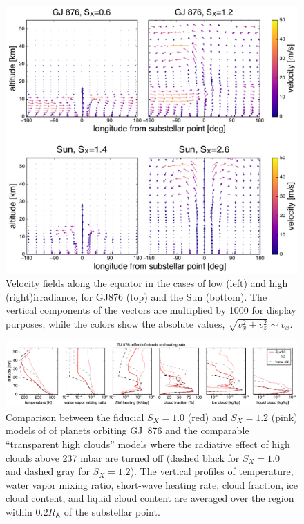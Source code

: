\documentclass[11pt,numberedappendix,twocolappendix,]{emulateapj}
\def\wv{water vapor}
\begin{document}
\begin{figure}[htb]
    \begin{center}
    \includegraphics[width=1\hsize]{vectormap_z_1000.pdf}
    \end{center}
\caption{Velocity fields along the equator in the cases of low (left) and high (right)irradiance, for GJ876 (top) and the Sun (bottom). The vertical components of the vectors are multiplied by 1000 for display purposes, while the colors show the absolute values, $\sqrt{v_x^2 + v_z^2} \sim  v_x$. }
\label{fig:vectormap}
\end{figure}


\begin{figure}[htb]
    \begin{center}
    \includegraphics[width=1\hsize]{GJ876_heat_cld.pdf}
    \end{center}
\caption{Comparison between the fiducial $S_X=1.0$ (red) and $S_X=1.2$ (pink) models of of planets orbiting GJ~876 and the comparable ``transparent high clouds'' models where the radiative effect of high clouds above 237 mbar are turned off (dashed black for $S_X=1.0$ and dashed gray for $S_X=1.2$). The vertical profiles of temperature, \wv{} mixing ratio, short-wave heating rate, cloud fraction, ice cloud content, and liquid cloud content are averaged over the region within $0.2R_\earth $ of the substellar point. }
\label{fig:GJ876_heat_cld}
\end{figure}
\end{document}
